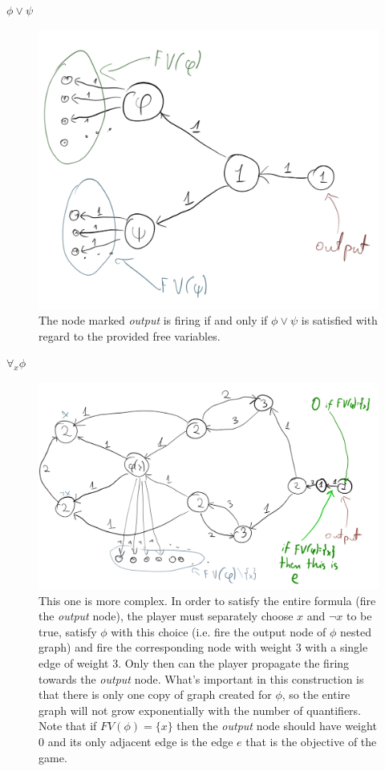 \noindent
\underline{$\phi \lor \psi$}
\begin{figure}[H]
      \centering
      \caption{
            The node marked \textit{output} is firing if and only if $\phi \lor \psi$
            is satisfied with regard to the provided free variables.
      }
      \includegraphics[scale=0.2]{content/graphics/game11.png}
\end{figure}

\noindent
\underline{$\forall_{x} \phi$}
\begin{figure}[H]
      \centering
      \caption{
            This one is more complex. In order to satisfy the entire formula (fire the \textit{output} node),
            the player must separately choose $x$ and $\lnot x$ to be true, satisfy $\phi$ with this choice (i.e.
            fire the output node of $\phi$ nested graph) and fire the corresponding node with weight 3 with a single
            edge of weight 3. Only then can the player propagate the firing towards the \textit{output} node.
            What's important in this construction is that there is only one copy of graph created for $\phi$,
            so the entire graph will not grow exponentially with the number of quantifiers.
            Note that if $FV(\phi) = \{ x \}$ then the \textit{output} node should have weight 0 and its only
            adjacent edge is the edge $e$ that is the objective of the game.
      }
      \includegraphics[scale=0.2]{content/graphics/game12.png}
\end{figure}

